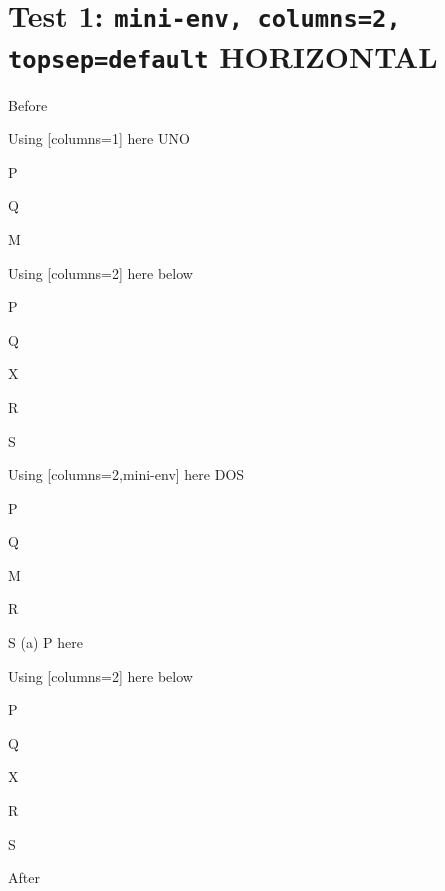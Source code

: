 \documentclass[12pt]{article}
\begin{document}

\section{Test 1: \texttt{mini-env, columns=2, topsep=default} HORIZONTAL}

Before
\begin{enumext}[columns=2]

\item Using [columns=1] here UNO
  \begin{enumext}[columns=1]%
     \item  P \item Q \item M %
  \end{enumext}

\item Using [columns=2] here below
\begin{enumext}[columns=2]%
     \item  P \item Q \item X  \item R \item S
  \end{enumext}

\columnbreak

\item Using [columns=2,mini-env] here DOS
  \begin{enumext}[columns=2,mini-env={0.4\linewidth}]%
    \item  P \item Q \item M \item R \item S
    \miniright
    (a) P here
  \end{enumext}

\item Using [columns=2] here below
\begin{enumext}[columns=2]%
     \item  P \item Q \item X  \item R \item S
  \end{enumext}

\end{enumext}
After
\end{document}
